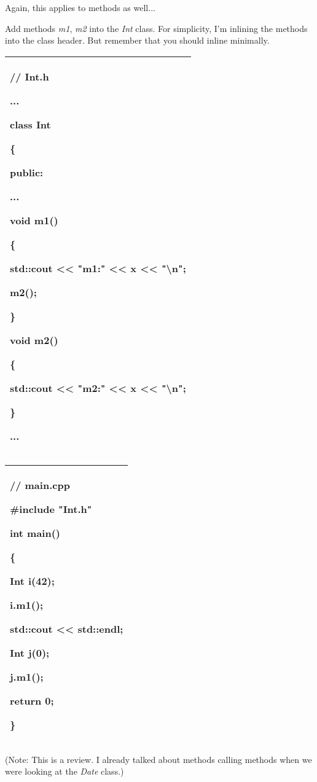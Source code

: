 \documentclass[
]{article}
\begin{document}
Again, this applies to methods as well...

Add methods \emph{m1}, \emph{m2} into the \emph{Int} class. For
simplicity, I'm inlining the methods into the class header. But remember
that you should inline minimally.

\begin{longtable}[]{@{}l@{}}
\toprule
\endhead
\begin{minipage}[t]{0.97\columnwidth}\raggedright
// Int.h

...

class Int

\{

public:

...

void m1()

\{

std::cout \textless\textless{} "m1:" \textless\textless{} x
\textless\textless{} "\textbackslash n";

m2();

\}

void m2()

\{

std::cout \textless\textless{} "m2:" \textless\textless{} x
\textless\textless{} "\textbackslash n";

\}

...\strut
\end{minipage}\tabularnewline
\bottomrule
\end{longtable}

\begin{longtable}[]{@{}l@{}}
\toprule
\endhead
\begin{minipage}[t]{0.97\columnwidth}\raggedright
// main.cpp

\#include "Int.h"

int main()

\{

Int i(42);

i.m1();

std::cout \textless\textless{} std::endl;

Int j(0);

j.m1();

return 0;

\}\strut
\end{minipage}\tabularnewline
\bottomrule
\end{longtable}

(Note: This is a review. I already talked about methods calling methods
when we were looking at the \emph{Date} class.)
\end{document}
